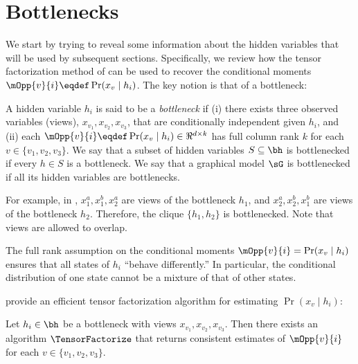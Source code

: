 \section{Bottlenecks}
\label{sec:bottlenecks}

We start by trying to reveal some information about the hidden variables
that will be used by subsequent sections.
Specifically, we review how
the tensor factorization method of \citet{anandkumar13tensor}
can be used to recover the conditional moments
$\mOpp{v}{i} \eqdef \Pr(x_v \mid h_i)$.
The key notion is that of a bottleneck:

\begin{definition}[Bottleneck]
  \label{def:bottleneck}
  A hidden variable $h_i$ is said to be a \emph{bottleneck} if (i) there
  exists three observed variables (views), $x_{v_1}, x_{v_2}, x_{v_3}$,
  that are conditionally independent given $h_i$,
  and (ii) each $\mOpp{v}{i} \eqdef \Pr(x_v \mid h_i) \in \Re^{d \times k}$ has full column rank $k$
  for each $v \in \{v_1, v_2, v_3\}$.
  We say that a subset of hidden variables $S \subseteq \bh$ is bottlenecked
  if every $h \in S$ is a bottleneck.
  We say that a graphical model $\sG$ is bottlenecked if all its hidden variables
  are bottlenecks.
\end{definition}
For example, in , $x_1^a,x_1^b,x_2^a$ are views of the bottleneck $h_1$,
and $x_2^a,x_2^b,x_1^b$ are views of the bottleneck $h_2$.  Therefore, the clique
$\{h_1,h_2\}$ is bottlenecked.  Note that views are allowed to overlap.

The full rank assumption on the conditional moments $\mOpp{v}{i} = \Pr(x_v \mid h_i)$
ensures that all states of $h_i$ ``behave differently.''
In particular, the conditional distribution of one state cannot be
a mixture of that of other states.

%  

\citet{anandkumar12moments} provide an efficient tensor factorization algorithm
for estimating $\Pr(x_v \mid h_i)$:
\begin{theorem}
Let $h_i \in \bh$ be a bottleneck with views $x_{v_1},x_{v_2},x_{v_3}$.
Then there exists an algorithm $\TensorFactorize$ that
returns consistent estimates of $\mOpp{v}{i}$ for each $v \in \{v_1,v_2,v_3\}$.
\end{theorem}

